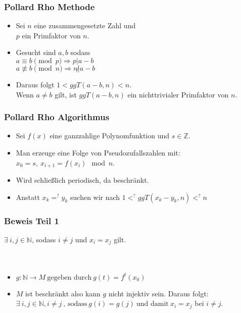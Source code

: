 \documentclass[mathserif, compress]{beamer}
\begin{document}
\begin{frame}
  \frametitle{Pollard Rho Methode}
  \begin{itemize}
    \item<2-> Sei $n$ eine zusammengesetzte Zahl und \\$p$ ein Primfaktor von $n$.
      \vspace{3mm}
    \item<3-> Gesucht sind $a, b$ sodass\\
              $a \equiv b \pmod p \Rightarrow p|a-b$ \\
              $a \not \equiv b \pmod n \Rightarrow n \not | a-b$
      \vspace{3mm}
    \item<4-> Daraus folgt $1<ggT(a-b,n)< n$. \\Wenn $a\not = b$ gilt, ist $ggT(a-b,n)$ ein nichttrivialer Primfaktor von $n$.
  \end{itemize}
\end{frame}

\begin{frame}
  \frametitle{Pollard Rho Algorithmus}
  \begin{itemize}
    \item<2-> Sei $f(x)$ eine ganzzahlige Polynomfunktion und $s \in \mathbb{Z}$.
     \vspace{3mm}
    \item<3-> Man erzeuge eine Folge von Pseudozufallszahlen mit:\\ $x_0= s, \ x_{i+1}=f(x_i)\mod n$.
   \vspace{3mm}
    \item<4-> Wird schlie\ss{}lich periodisch, da beschr\"ankt.
    \vspace{3mm}
    \item<5-> Anstatt $x_k=^?y_k$ suchen wir nach $1 <^? ggT(x_k - y_k, n)<^? n$
  \end{itemize}
\end{frame}

\begin{frame}
  \frametitle{Beweis Teil 1}
$\exists \ i,j \in \mathbb{N}$, sodass $i \not= j$ und $x_i = x_j$ gilt.\\
\ \\
\ \\
  \begin{itemize}
    \item<2->  $g:\mathbb{N} \rightarrow M \ \text{gegeben durch} \ g(t)=f^t(x_0)$
      \vspace{3mm}
    \item<3-> $M$ ist beschr\"ankt also kann $g$ nicht injektiv sein. Daraus folgt:\\
	      $\exists \ i,j \in \mathbb{N}, i\not=j \ \text{, sodass} \ g(i)=g(j) \ \text{und damit} \ x_i=x_j$ bei $i\not=j$.
  \end{itemize}
\end{frame}
\end{document}
